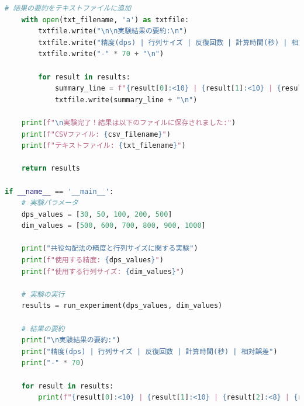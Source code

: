 \documentclass{article}
\begin{document}
\begin{lstlisting}[language=Python, caption=cg\_experiment.py]
    # 結果の要約をテキストファイルに追加
    with open(txt_filename, 'a') as txtfile:
        txtfile.write("\n\n実験結果の要約:\n")
        txtfile.write("精度(dps) | 行列サイズ | 反復回数 | 計算時間(秒) | 相対誤差\n")
        txtfile.write("-" * 70 + "\n")
        
        for result in results:
            summary_line = f"{result[0]:<10} | {result[1]:<10} | {result[2]:<8} | {result[3]:<12.4f} | {result[4]:.4e}"
            txtfile.write(summary_line + "\n")
    
    print(f"\n実験完了！結果は以下のファイルに保存されました:")
    print(f"CSVファイル: {csv_filename}")
    print(f"テキストファイル: {txt_filename}")
    
    return results

if __name__ == '__main__':
    # 実験パラメータ
    dps_values = [30, 50, 100, 200, 500]
    dim_values = [500, 600, 700, 800, 900, 1000]
    
    print("共役勾配法の精度と行列サイズに関する実験")
    print(f"使用する精度: {dps_values}")
    print(f"使用する行列サイズ: {dim_values}")
    
    # 実験の実行
    results = run_experiment(dps_values, dim_values)
    
    # 結果の要約
    print("\n実験結果の要約:")
    print("精度(dps) | 行列サイズ | 反復回数 | 計算時間(秒) | 相対誤差")
    print("-" * 70)
    
    for result in results:
        print(f"{result[0]:<10} | {result[1]:<10} | {result[2]:<8} | {result[3]:<12.4f} | {result[4]:.4e}")
\end{lstlisting}
\end{document}
